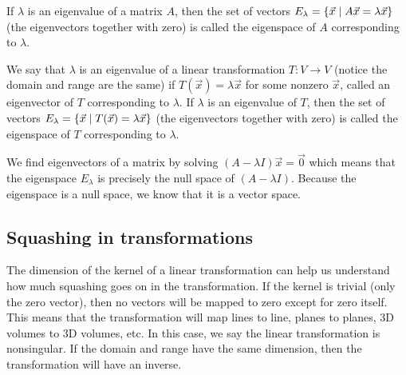 \begin{definition}[Eigenspaces]
If $\lambda$ is an eigenvalue of a matrix $A$, then the set of vectors $E_\lambda = \{\vec x \mid A\vec x = \lambda \vec x\}$ (the eigenvectors together with zero) is called the eigenspace of $A$ corresponding to $\lambda$. 

We say that $\lambda$ is an eigenvalue of a linear transformation $T\colon V\to V$ (notice the domain and range are the same) if 
$T(\vec x)=\lambda \vec x$ for some nonzero $\vec x$, called an eigenvector of $T$ corresponding to $\lambda$. 
If $\lambda$ is an eigenvalue of $T$, then the set of vectors $E_\lambda = \{\vec x \mid T(\vec x) = \lambda \vec x\}$ (the eigenvectors together with zero) is called the eigenspace of $T$ corresponding to $\lambda$. 
\end{definition}
We find eigenvectors of a matrix by solving $(A-\lambda I)\vec x = \vec 0$ which means that the eigenspace $E_\lambda$ is precisely the null space of $(A-\lambda I)$.  Because the eigenspace is a null space, we know that it is a vector space.



\subsection{Squashing in transformations}

The dimension of the kernel of a linear transformation can help us understand how much squashing goes on in the transformation.  If the kernel is trivial (only the zero vector), then no vectors will be mapped to zero except for zero itself.  This means that the transformation will map lines to line, planes to planes, 3D volumes to 3D volumes, etc.  In this case, we say the linear transformation is nonsingular. If the domain and range have the same dimension, then the transformation will have an inverse. 

